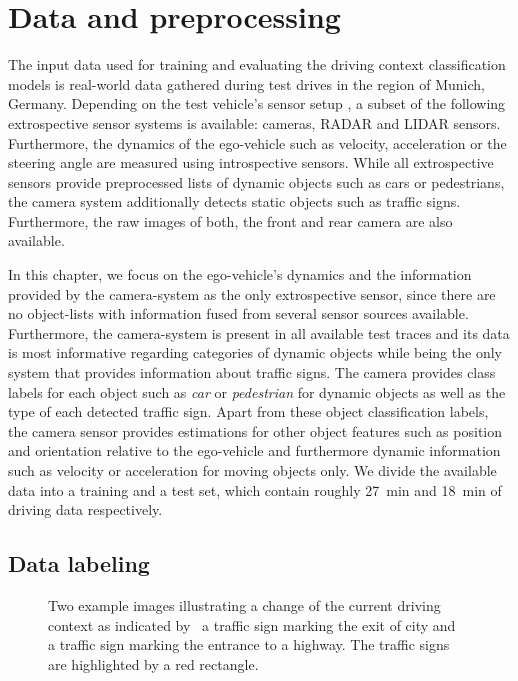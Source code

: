\section{Data and preprocessing}%
\label{sec:data_and_preprocessing_context_classification}

The input data used for training and evaluating the driving context classification models is real-world data gathered during test drives in the region of Munich, Germany.
Depending on the test vehicle's sensor setup \parencite{Aeberhard2015}, a subset of the following extrospective sensor systems is available: cameras, \ac{RADAR} and \ac{LIDAR} sensors.
Furthermore, the dynamics of the ego-vehicle such as velocity, acceleration or the steering angle are measured using introspective sensors.
While all extrospective sensors provide preprocessed lists of dynamic objects such as cars or pedestrians, the camera system additionally detects static objects such as traffic signs.
Furthermore, the raw images of both, the front and rear camera are also available. 

In this chapter, we focus on the ego-vehicle's dynamics and the information provided by the camera-system as the only extrospective sensor, since there are no object-lists with information fused from several sensor sources available.
Furthermore, the camera-system is present in all available test traces and its data is most informative regarding categories of dynamic objects while being the only system that provides information about traffic signs.
The camera provides class labels for each object such as \emph{car} or \emph{pedestrian} for dynamic objects as well as the type of each detected traffic sign.
Apart from these object classification labels, the camera sensor provides estimations for other object features such as position and orientation relative to the ego-vehicle and furthermore dynamic information such as velocity or acceleration for moving objects only.
We divide the available data into a training and a test set, which contain roughly \SI{27}{\minute} and \SI{18}{\minute} of driving data respectively.

\subsection{Data labeling}%
\label{subsec:data_labeling}

\begin{figure}[t]
    \centering
    \caption{Two example images illustrating a change of the current driving context as indicated by~\protect{} a traffic sign marking the exit of city and~\protect{} a traffic sign marking the entrance to a highway.
    The traffic signs are highlighted by a red rectangle.}
    \label{fig:context_class_manual_labeling}
\end{figure}

